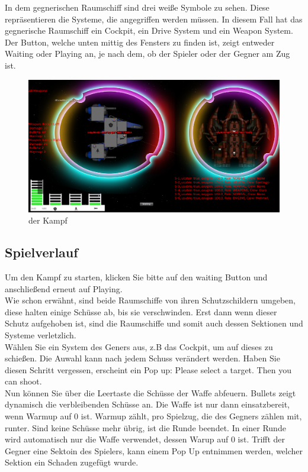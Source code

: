 \documentclass[fontsize=12pt,paper=a4,twoside]{scrartcl}
\begin{document}
In dem gegnerischen Raumschiff sind drei weiße Symbole zu sehen. Diese repräsentieren die Systeme, die angegriffen werden müssen. In diesem Fall hat das gegnerische Raumschiff
ein Cockpit, ein Drive System und ein Weapon System.\\ 

Der Button, welche unten mittig des Fensters zu finden ist, zeigt entweder Waiting oder Playing an,
je nach dem, ob der Spieler oder der Gegner am Zug ist.

\begin{figure}[htp]
	\centering
	\includegraphics[width=1.00\linewidth]{pics/combatScreenRot01.png}
	\caption{der Kampf}
	\label{fig1}
\end{figure}

\subsection{Spielverlauf}

Um den Kampf zu starten, klicken Sie bitte auf den waiting Button und anschließend erneut
auf Playing.\\

Wie schon erwähnt, sind beide Raumschiffe von ihren Schutzschildern umgeben, diese halten einige 
Schüsse ab, bis sie verschwinden. Erst dann wenn dieser Schutz aufgehoben ist, sind die Raumschiffe und somit auch dessen Sektionen und Systeme verletzlich.\\

Wählen Sie ein System des Geners aus, z.B das Cockpit, um auf dieses zu schießen. Die Auwahl kann nach jedem Schuss verändert werden. Haben Sie diesen
Schritt vergessen, erscheint ein Pop up: Please select a target. Then you can shoot.\\

Nun können Sie über die Leertaste die Schüsse der Waffe abfeuern. 
Bullets zeigt dynamisch die verbleibenden Schüsse an. Die Waffe ist nur dann einsatzbereit, wenn Warmup auf 0 ist. Warmup zählt, pro Spielzug, die des Gegners zählen mit, runter. Sind keine Schüsse mehr übrig, ist die Runde beendet.
In einer Runde wird automatisch nur die Waffe verwendet, dessen Warup auf 0 ist.
Trifft der Gegner eine Sektoin des Spielers, kann einem Pop Up entnimmen werden, welcher Sektion ein Schaden zugefügt wurde.\\
\end{document}
